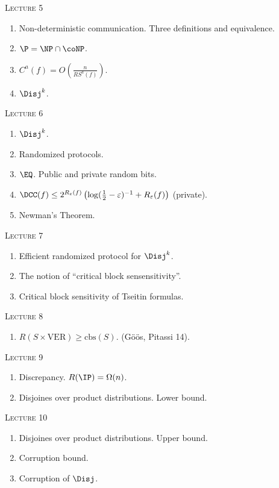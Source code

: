 \centerline{\textsc{Lecture 5}}

\begin{enumerate}
    \item Non-deterministic communication. Three definitions and equivalence.
    \item $\P = \NP \cap \coNP$.
    \item $C^a(f) = O\left(\frac{n}{RS^a(f)}\right)$.
    \item $\Disj^k$.

\end{enumerate}

\centerline{\textsc{Lecture 6}}

\begin{enumerate}
    \item $\Disj^k$.
    \item Randomized protocols.
    \item $\EQ$. Public and private random bits.
    \item $\DCC(f) \le 2^{R_{\varepsilon}(f)} \left( \log(\frac{1}{2} - \varepsilon)^{-1} +
        R_{\varepsilon}(f) \right)$ (private).
    \item Newman's Theorem. 
\end{enumerate}



\centerline{\textsc{Lecture 7}}

\begin{enumerate}
    \item Efficient randomized protocol for $\Disj^k$.
    \item The notion of ``critical block sensensitivity''.
    \item Critical block sensitivity of Tseitin formulas.
\end{enumerate}

\centerline{\textsc{Lecture 8}}

\begin{enumerate}
    \item $R(S \times \mathrm{VER}) \ge \mathrm{cbs}(S)$. (G{\"{o}}{\"{o}}s, Pitassi 14).
\end{enumerate}

\centerline{\textsc{Lecture 9}}

\begin{enumerate}
    \item Discrepancy. $R(\IP) = \Omega(n)$.
    \item Disjoines over product distributions. Lower bound.
\end{enumerate}

\centerline{\textsc{Lecture 10}}

\begin{enumerate}
    \item Disjoines over product distributions. Upper bound.
    \item Corruption bound.
    \item Corruption of $\Disj$.
\end{enumerate}